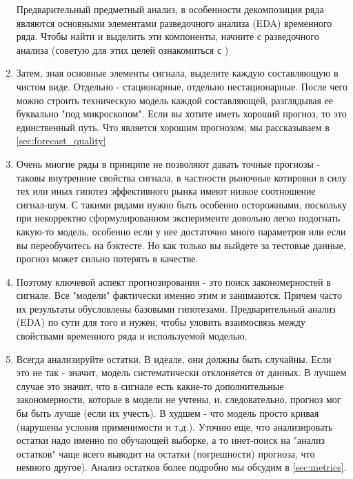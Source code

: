 \begin{enumerate}
    Предварительный предметный
    анализ, в особенности декомпозиция ряда являются основными
    элементами разведочного анализа (EDA) временного ряда.
    Чтобы найти и выделить эти компоненты, начните с разведочного
    анализа (советую для этих целей ознакомиться с \cite{tukeyEDA1981})

  \item Затем, зная основные элементы сигнала, выделите каждую
    составляющую в чистом виде. Отдельно - стационарные, отдельно
    нестационарные. После чего можно строить техническую модель каждой
    составляющей, разглядывая ее буквально "под микроскопом". Если вы
    хотите иметь хороший прогноз, то это единственный путь. Что
    является хорошим прогнозом, мы рассказываем в
    \autoref{sec:forecast_quality}

  \item Очень многие ряды в принципе не позволяют давать точные
    прогнозы - таковы внутренние свойства сигнала, в частности
    рыночные котировки в силу тех или иных гипотез эффективного
    рынка имеют низкое соотношение сигнал-шум. С такими рядами
    нужно быть особенно осторожными, поскольку при некорректно
    сформулированном эксперименте довольно легко подогнать
    какую-то модель, особенно если у нее достаточно много
    параметров или если вы переобучитесь на
    бэктесте. Но как только вы выйдете за тестовые данные, прогноз
    может сильно потерять в качестве.
  \item Поэтому ключевой аспект прогнозирования - это поиск
    закономерностей в сигнале. Все "модели" фактически именно этим
    и занимаются. Причем часто их
    результаты обусловлены базовыми гипотезами. Предварительный
    анализ (EDA) по сути для того и нужен, чтобы уловить
    взаимосвязь между свойствами временного ряда и используемой моделью.

  \item Всегда анализируйте остатки. В идеале, они должны быть
    случайны. Если это не так - значит, модель
    систематически отклоняется от данных. В лучшем случае это значит, что
    в сигнале есть какие-то дополнительные закономерности, которые в
    модели не учтены, и, следовательно, прогноз мог бы быть лучше (если
    их учесть). В худшем - что модель просто кривая (нарушены условия
    применимости и т.д.). Уточню еще, что анализировать остатки надо
    именно по обучающей выборке, а то инет-поиск на "анализ остатков"
  чаще всего выводит на остатки (погрешности) прогноза, что немного другое).
  Анализ остатков более подробно мы обсудим в \autoref{sec:metrics}.
\end{enumerate}

\printbibliography[heading=subbibliography, title={Источники}]
